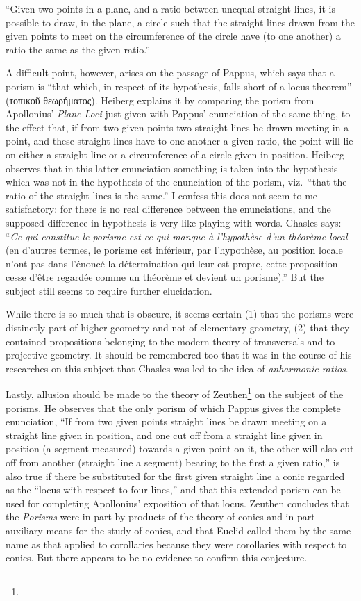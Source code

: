``Given two points in a plane, and a ratio between unequal straight lines, it is possible to draw, in the plane, a circle such that the straight lines drawn from the given points to meet on the circumference of the circle have (to one another) a ratio the same as the given ratio.''

A difficult point, however, arises on the passage of Pappus, which says that a porism is ``that which, in respect of its hypothesis, falls short of a locus-theorem'' (τοπικοῦ θεωρήματος). Heiberg explains it by comparing the porism from Apollonius' \emph{Plane Loci} just given with Pappus' enunciation of the same thing, to the effect that, if from two given points two straight lines be drawn meeting in a point, and these straight lines have to one another a given ratio, the point will lie on either a straight line or a circumference of a circle given in position. Heiberg observes that in this latter enunciation something is taken into the hypothesis which was not in the hypothesis of the enunciation of the porism, viz.\ ``that the ratio of the straight lines is the same.'' I confess this does not seem to me satisfactory: for there is no real difference between the enunciations, and the supposed difference in hypothesis is very like playing with words. Chasles says: ``\emph{Ce qui constitue le porisme est ce qui manque à l'hypothèse d'un théorème local} (en d'autres termes, le porisme est inférieur, par l'hypothèse, au position locale n'ont pas dans l'énoncé la détermination qui leur est propre, cette proposition cesse d'être regardée comme un théorème et devient un porisme).'' But the subject still seems to require further elucidation.

While there is so much that is obscure, it seems certain (1) that the porisms were distinctly part of higher geometry and not of elementary geometry, (2) that they contained propositions belonging to the modern theory of transversals and to projective geometry. It should be remembered too that it was in the course of his researches on this subject that Chasles was led to the idea of \emph{anharmonic ratios}.

Lastly, allusion should be made to the theory of Zeuthen\footnote{} on the subject of the porisms. He observes that the only porism of which Pappus gives the complete enunciation, ``If from two given points straight lines be drawn meeting on a straight line given in position, and one cut off from a straight line given in position (a segment measured) towards a given point on it, the other will also cut off from another (straight line a segment) bearing to the first a given ratio,'' is also true if there be substituted for the first given straight line a conic regarded as the ``locus with respect to four lines,'' and that this extended porism can be used for completing Apollonius' exposition of that locus. Zeuthen concludes that the \emph{Porisms} were in part by-products of the theory of conics and in part auxiliary means for the study of conics, and that Euclid called them by the same name as that applied to corollaries because they were corollaries with respect to conics. But there appears to be no evidence to confirm this conjecture.